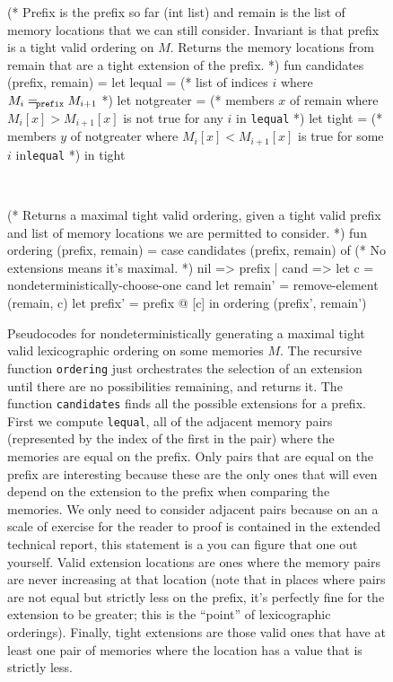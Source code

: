\documentclass[twocolumn]{article}
\begin{document}
\begin{figure}[htp]
  \begin{code}
    (* Prefix is the prefix so far (int list) and remain is the list of memory
       locations that we can still consider. Invariant is that prefix is a
       tight valid ordering on $M$. Returns the memory locations from remain 
       that are a tight extension of the prefix. *)
    fun candidates (prefix, remain) =
      let lequal = (* list of indices $i$ where
                      $M_i =_{\tt\! prefix} M_{i+1}$ *)
      let notgreater = (* members $x$ of remain where
                          $M_i[x] > M_{i+1}[x]$ is
                          not true for any $i$ in
                         {\tt lequal} *)
      let tight = (* members $y$ of notgreater where
                     $M_i[x] < M_{i+1}[x]$ is true
                     for some $i$ in{\tt lequal} *)
      in tight

    \

    (* Returns a maximal tight valid ordering, given a tight valid prefix and 
       list of memory locations we are permitted to consider. *)
    fun ordering (prefix, remain) =
      case candidates (prefix, remain) of
        (* No extensions means it's maximal. *)
        nil => prefix
      | cand =>
        let c = nondeterministically-choose-one cand
        let remain' = remove-element (remain, c)
        let prefix' = prefix @ [c]
        in ordering (prefix', remain')
  \end{code}

  \caption{Pseudocodes for nondeterministically generating a maximal
    tight valid lexicographic ordering on some memories $M$. The
    recursive function {\tt ordering} just orchestrates the selection
    of an extension until there are no possibilities remaining, and
    returns it. The function {\tt candidates} finds all the possible
    extensions for a prefix. First we compute {\tt lequal}, all of the
    adjacent memory pairs (represented by the index of the first in
    the pair) where the memories are equal on the prefix. Only pairs
    that are equal on the prefix are interesting because these are the
    only ones that will even depend on the extension to the prefix
    when comparing the memories. We only need to consider adjacent
    pairs because on an a scale of exercise for the reader to proof is
    contained in the extended technical report, this statement is a
    you can figure that one out yourself. Valid extension locations
    are ones where the memory pairs are never increasing at that
    location (note that in places where pairs are not equal but
    strictly less on the prefix, it's perfectly fine for the extension
    to be greater; this is the ``point'' of lexicographic orderings).
    Finally, tight extensions are those valid ones that have at least
    one pair of memories where the location has a value that is
    strictly less.}
  \label{fig:ordering}
\end{figure}
\end{document}
